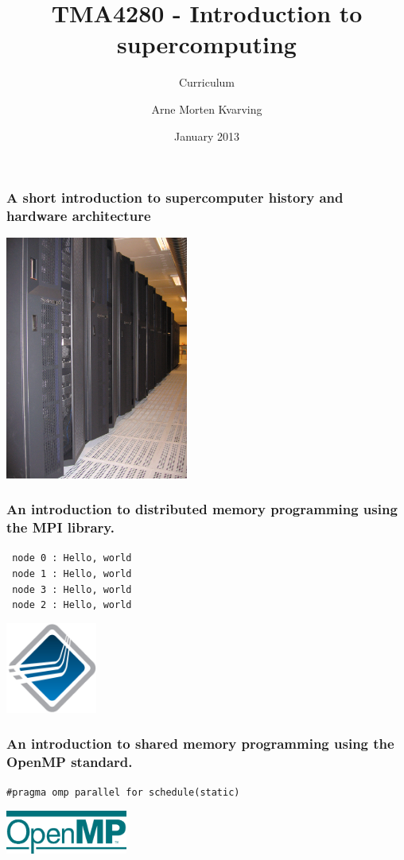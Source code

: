 \documentclass{beamer}
\title{TMA4280 - Introduction to supercomputing}
\subtitle{Curriculum}
\author{Arne Morten Kvarving}
\institute{SINTEF ICT}
\date{January 2013}
\begin{document}
\maketitle
\begin{frame}\frametitle{A short introduction to supercomputer history and
                         hardware architecture}
\begin{center}
\includegraphics[width=6cm]{njord_1}
\end{center}
\end{frame}
\begin{frame}\frametitle{An introduction to distributed memory programming
                         using the MPI library.}
\begin{center}
\texttt{  node 0 :   Hello, world}\\
\texttt{  node 1 :   Hello, world}\\
\texttt{  node 3 :   Hello, world}\\
\texttt{  node 2 :   Hello, world}
\end{center}
\begin{center}
\includegraphics[width=3cm]{open-mpi-logo}
\end{center}
\end{frame}

\begin{frame}\frametitle{An introduction to shared memory programming
                         using the OpenMP standard.}
\begin{center}
\texttt{\#pragma omp parallel for schedule(static)}
\end{center}
\begin{center}
\includegraphics[width=4cm]{openmp}
\end{center}
\end{frame}
\end{document}
